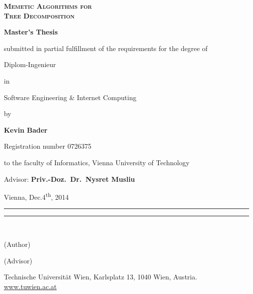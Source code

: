 \documentclass[thesis.tex]{subfiles}
\begin{document}
{

\vspace{4\baselineskip}
\begin{center}
   \bfseries\scshape\HUGE
   Memetic Algorithms for\\
   Tree Decomposition
\end{center}

\bigskip
\begin{center}
   \bfseries\LARGE
   Master's Thesis
\end{center}

\smallskip
\begin{center}
   submitted in partial fulfillment of the requirements for the degree of
\end{center}

\smallskip
\begin{center}
   \LARGE
   Diplom-Ingenieur
\end{center}

\smallskip
\begin{center}
   in
\end{center}

\smallskip
\begin{center}
   \LARGE
   Software Engineering \& Internet Computing
\end{center}

\smallskip
\begin{center}
   by
\end{center}

\smallskip
\begin{center}
   \LARGE\bfseries
   Kevin Bader
\end{center}
\begin{center}
   Registration number 0726375
\end{center}

\smallskip
\begin{center}
   to the faculty of Informatics, Vienna University of Technology
\end{center}

\smallskip
\begin{center}
   Advisor: \textbf{Priv.-Doz.\ Dr.\ Nysret Musliu}
\end{center}

\vspace{7\baselineskip}
\noindent
Vienna, Dec.\@ 4\textsuperscript{th}, 2014\hfill \rule{.35\textwidth}{.5pt}\hfill \rule{.35\textwidth}{.5pt}\\[0.2\baselineskip]
\phantom{Wien, am 4.12.2014}\hfill \parbox{.35\textwidth}{\centering\sffamily (Author)}\hfill \parbox{.35\textwidth}{\centering\sffamily (Advisor)}

\vspace{4\baselineskip}
\footnotesize
\begin{center}
   Technische Universität Wien, Karlsplatz 13, 1040 Wien, Austria. \href{www.tuwien.ac.at}{www.tuwien.ac.at}
\end{center}

}

\restoregeometry
\end{document}
